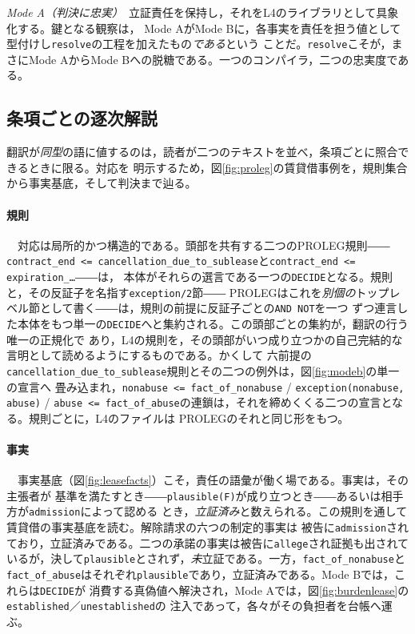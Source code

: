 \documentclass[11pt,a4paper]{ltjsarticle}
\newcommand{\code}[1]{\texttt{\small #1}}
\begin{document}
\emph{Mode A（判決に忠実）}　立証責任を保持し，それをL4のライブラリとして具象化する。鍵となる観察は，
Mode AがMode Bに，各事実を責任を担う値として型付けし\code{resolve}の工程を加えたもの\emph{である}という
ことだ。\code{resolve}こそが，まさにMode AからMode Bへの脱糖である。一つのコンパイラ，二つの忠実度である。

\subsection{条項ごとの逐次解説}\label{app:walkthrough}
翻訳が\emph{同型}の語に値するのは，読者が二つのテキストを並べ，条項ごとに照合できるときに限る。対応を
明示するため，図\ref{fig:proleg}の賃貸借事例を，規則集合から事実基底，そして判決まで辿る。

\paragraph{規則}　対応は局所的かつ構造的である。頭部を共有する二つのPROLEG規則――
\code{contract\_end <= cancellation\_due\_to\_sublease}と\code{contract\_end <= expiration\_\ldots}――は，
本体がそれらの選言である一つの\code{DECIDE}となる。規則と，その反証子を名指す\code{exception/2}節――
PROLEGはこれを\emph{別個の}トップレベル節として書く――は，規則の前提に反証子ごとの\code{AND NOT}を一つ
ずつ連言した本体をもつ単一の\code{DECIDE}へと集約される。この頭部ごとの集約が，翻訳の行う唯一の正規化で
あり，L4の規則を，その頭部がいつ成り立つかの自己完結的な言明として読めるようにするものである。かくして
六前提の\code{cancellation\_due\_to\_sublease}規則とその二つの例外は，図\ref{fig:modeb}の単一の宣言へ
畳み込まれ，\code{nonabuse <= fact\_of\_nonabuse} / \code{exception(nonabuse, abuse)} /
\code{abuse <= fact\_of\_abuse}の連鎖は，それを締めくくる二つの宣言となる。規則ごとに，L4のファイルは
PROLEGのそれと同じ形をもつ。

\paragraph{事実}　事実基底（図\ref{fig:leasefacts}）こそ，責任の語彙が働く場である。事実は，その主張者が
基準を満たすとき――\code{plausible(F)}が成り立つとき――あるいは相手方が\code{admission}によって認める
とき，\emph{立証済み}と数えられる。この規則を通して賃貸借の事実基底を読む。解除請求の六つの制定的事実は
被告に\code{admission}されており，立証済みである。二つの承諾の事実は被告に\code{allege}され証拠も出されて
いるが，決して\code{plausible}とされず，\emph{未}立証である。一方，\code{fact\_of\_nonabuse}と
\code{fact\_of\_abuse}はそれぞれ\code{plausible}であり，立証済みである。Mode Bでは，これらは\code{DECIDE}が
消費する真偽値へ解決され，Mode Aでは，図\ref{fig:burdenlease}の\code{established}／\code{unestablished}の
注入であって，各々がその負担者を台帳へ運ぶ。
\end{document}
